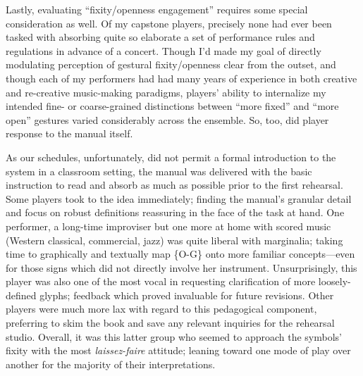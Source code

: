     Lastly, evaluating ``fixity/openness engagement'' requires some special consideration as well. Of my capstone players, precisely none had ever been tasked with absorbing quite so elaborate a set of performance rules and regulations in advance of a concert. Though I'd made my goal of directly modulating perception of gestural fixity/openness clear from the outset, and though each of my performers had had many years of experience in both creative and re-creative music-making paradigms, players' ability to internalize my intended fine- or coarse-grained distinctions between ``more fixed'' and ``more open'' gestures varied considerably across the ensemble. So, too, did player response to the manual itself. 

    
    As our schedules, unfortunately, did not permit a formal introduction to the system in a classroom setting, the manual was delivered with the basic instruction to read and absorb as much as possible prior to the first rehearsal. Some players took to the idea immediately; finding the manual's granular detail and focus on robust definitions reassuring in the face of the task at hand. One performer, a long-time improviser but one more at home with scored music (Western classical, commercial, jazz) was quite liberal with marginalia; taking time to graphically and textually map \{O-G\} onto more familiar concepts---even for those signs which did not directly involve her instrument. Unsurprisingly, this player was also one of the most vocal in requesting clarification of more loosely-defined glyphs; feedback which proved invaluable for future revisions. Other players were much more lax with regard to this pedagogical component, preferring to skim the book and save any relevant inquiries for the rehearsal studio. Overall, it was this latter group who seemed to approach the symbols' fixity with the most \textit{laissez-faire} attitude; leaning toward one mode of play over another for the majority of their interpretations. 
    
